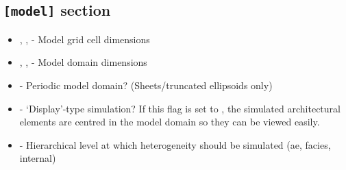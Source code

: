 \documentclass[letterpaper,10pt,english]{sphinxmanual}
\begin{document}
\subsection{\texttt{{[}model{]}} section}
\label{example:model-section}\begin{itemize}
\item {} 
, ,         - Model grid cell dimensions

\item {} 
, ,         - Model domain dimensions

\item {} 
             - Periodic model domain? (Sheets/truncated ellipsoids only)

\item {} 
              - `Display'-type simulation? If this flag is set to , the simulated architectural elements are centred in the model domain so they can be viewed easily.

\item {} 
                            - Hierarchical level at which heterogeneity should be simulated (ae, facies, internal)

\end{itemize}
\end{document}
